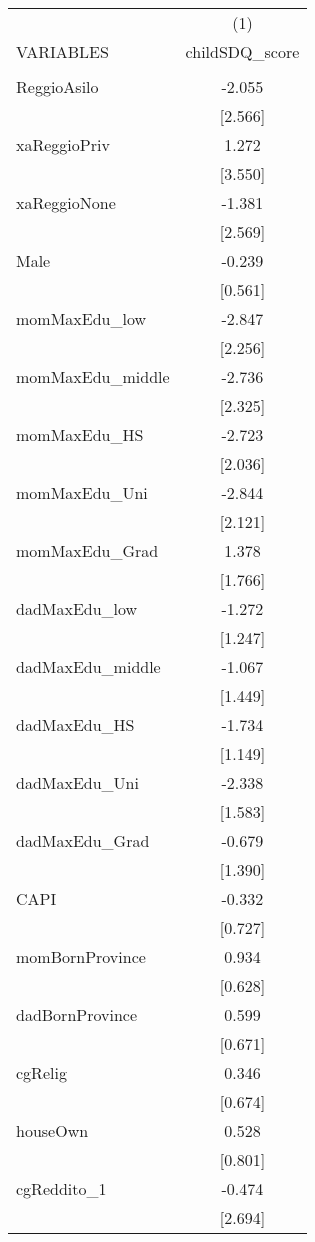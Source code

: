 \documentclass[]{article}
\begin{document}
\begin{tabular}{lc} \hline
 & (1) \\
VARIABLES & childSDQ\_score \\ \hline
 &  \\
ReggioAsilo & -2.055 \\
 & [2.566] \\
xaReggioPriv & 1.272 \\
 & [3.550] \\
xaReggioNone & -1.381 \\
 & [2.569] \\
Male & -0.239 \\
 & [0.561] \\
momMaxEdu\_low & -2.847 \\
 & [2.256] \\
momMaxEdu\_middle & -2.736 \\
 & [2.325] \\
momMaxEdu\_HS & -2.723 \\
 & [2.036] \\
momMaxEdu\_Uni & -2.844 \\
 & [2.121] \\
momMaxEdu\_Grad & 1.378 \\
 & [1.766] \\
dadMaxEdu\_low & -1.272 \\
 & [1.247] \\
dadMaxEdu\_middle & -1.067 \\
 & [1.449] \\
dadMaxEdu\_HS & -1.734 \\
 & [1.149] \\
dadMaxEdu\_Uni & -2.338 \\
 & [1.583] \\
dadMaxEdu\_Grad & -0.679 \\
 & [1.390] \\
CAPI & -0.332 \\
 & [0.727] \\
momBornProvince & 0.934 \\
 & [0.628] \\
dadBornProvince & 0.599 \\
 & [0.671] \\
cgRelig & 0.346 \\
 & [0.674] \\
houseOwn & 0.528 \\
 & [0.801] \\
cgReddito\_1 & -0.474 \\
 & [2.694] \\

\end{tabular}
\end{document}
